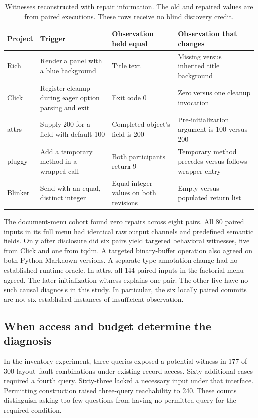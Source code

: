 \documentclass[conference]{IEEEtran}
\begin{document}
\begin{table}[t]
\caption{Witnesses reconstructed with repair information. The old and repaired values are from paired executions. These rows receive no blind discovery credit.}\label{cases}
\centering\small
\begin{tabular}{p{}p{}p{}p{}}\hline
Project & Trigger & Observation held equal & Observation that changes\\\hline
Rich & Render a panel with a blue background & Title text & Missing versus inherited title background\\
Click & Register cleanup during eager option parsing and exit & Exit code 0 & Zero versus one cleanup invocation\\
attrs & Supply 200 for a field with default 100 & Completed object's field is 200 & Pre-initialization argument is 100 versus 200\\
pluggy & Add a temporary method in a wrapped call & Both participants return 9 & Temporary method precedes versus follows wrapper entry\\
Blinker & Send with an equal, distinct integer & Equal integer values on both revisions & Empty versus populated return list\\\hline
\end{tabular}
\end{table}

The document-menu cohort found zero repairs across eight pairs. All 80 paired inputs in its full menu had identical raw output channels and predefined semantic fields. Only after disclosure did six pairs yield targeted behavioral witnesses, five from Click and one from tqdm. A targeted binary-buffer operation also agreed on both Python-Markdown versions. A separate type-annotation change had no established runtime oracle. In attrs, all 144 paired inputs in the factorial menu agreed. The later initialization witness explains one pair. The other five have no such causal diagnosis in this study. In particular, the six locally paired commits are not six established instances of insufficient observation.

\subsection{When access and budget determine the diagnosis}
In the inventory experiment, three queries exposed a potential witness in 177 of 300 layout--fault combinations under existing-record access. Sixty additional cases required a fourth query. Sixty-three lacked a necessary input under that interface. Permitting construction raised three-query reachability to 240. These counts distinguish asking too few questions from having no permitted query for the required condition.
\end{document}
